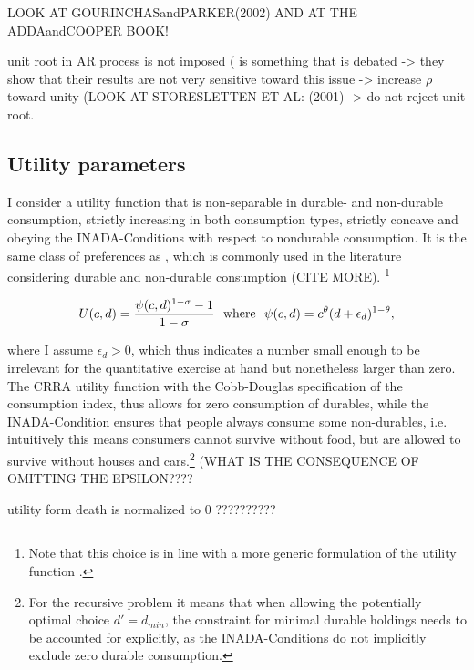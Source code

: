 \documentclass[a4paper,12pt,legno]{article}
\begin{document}
LOOK AT GOURINCHASandPARKER(2002) AND AT THE ADDAandCOOPER BOOK! 

 unit root in AR process is not imposed  ( is something that is debated -> they show that their results are not very sensitive toward this issue -> increase $\rho$ toward unity (LOOK AT STORESLETTEN ET AL: (2001) -> do not reject unit root.

\subsection{Utility parameters}

I consider a utility function that is non-separable in durable- and non-durable consumption, strictly increasing in both consumption types, strictly concave and obeying the INADA-Conditions with respect to nondurable consumption. It is the same class of preferences as \cite{hintermaier2010}, which is commonly used in the literature considering durable and non-durable consumption (CITE MORE). \footnote{Note that this choice is in line with a more generic formulation of the utility function \citep{FV&K2011}.}

\begin{equation}
U(c,d)=\frac{\psi(c,d)^{1-\sigma}-1}{1-\sigma} \ \ \textnormal{where} \ \ \psi(c,d)=c^{\theta}(d+\epsilon_{d})^{1-\theta},
\end{equation}

where I assume $\epsilon_{d} > 0$, which thus indicates a number small enough to be irrelevant for the quantitative exercise at hand but nonetheless larger than zero. The CRRA utility function with the Cobb-Douglas specification of the consumption index, thus allows for zero consumption of durables, while the INADA-Condition ensures that people always consume some non-durables, i.e. intuitively this means consumers cannot survive without food, but are allowed to survive without houses and cars.\footnote{For the recursive problem it means that when allowing the potentially optimal choice $d' = d_{min}$, the constraint for minimal durable holdings needs to be accounted for explicitly, as the INADA-Conditions do not implicitly exclude zero durable consumption.} (WHAT IS THE CONSEQUENCE OF OMITTING THE EPSILON???? 

\citep{FV&K2011} utility form death is normalized to 0 ??????????
\end{document}
